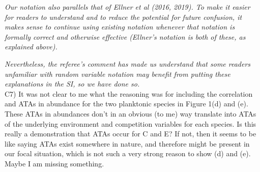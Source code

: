 \documentclass[letterpaper,11pt]{article}
\begin{document}
\emph{Our notation also parallels that of Ellner et al (2016, 2019). To make it
easier for readers to understand and to reduce the potential for future confusion, it makes sense to continue
using existing notation whenever that notation is formally correct and otherwise effective (Ellner's notation is 
both of these, as explained above).}

\emph{Nevertheless, the referee's comment has made us understand that some readers unfamiliar with random variable 
notation may benefit from putting these explanations in the SI, so we have done so.} \\

\noindent C7) It was not clear to me what the reasoning was for including the correlation and ATAs in abundance for the two planktonic species in Figure 1(d) and (e).  These ATAs in abundances don't in an obvious (to me) way translate into ATAs of the underlying environment and competition variables for each species. Is this really a demonstration that ATAs occur for C and E?  If not, then it seems to be like saying ATAs exist somewhere in nature, and therefore might be present in our focal situation, which is not such a very strong reason to show (d) and (e).  Maybe I am missing something. \\
\end{document}
